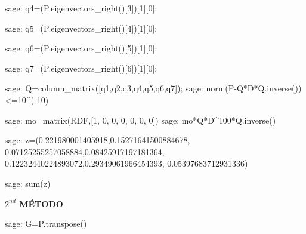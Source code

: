\begin{sagecommandline}
    sage: q4=(P.eigenvectors_right()[3])[1][0];
\end{sagecommandline}

\begin{sagecommandline}
    sage: q5=(P.eigenvectors_right()[4])[1][0];
\end{sagecommandline}

\begin{sagecommandline}
    sage: q6=(P.eigenvectors_right()[5])[1][0];
\end{sagecommandline}

\begin{sagecommandline}
    sage: q7=(P.eigenvectors_right()[6])[1][0];
\end{sagecommandline}

\begin{sagecommandline}
    sage: Q=column_matrix([q1,q2,q3,q4,q5,q6,q7]);
    sage: norm(P-Q*D*Q.inverse())<=10^(-10)
\end{sagecommandline}
    
\begin{sagecommandline}
    sage: mo=matrix(RDF,[1, 0, 0, 0, 0, 0, 0])
    sage: mo*Q*D^100*Q.inverse()
\end{sagecommandline}
    
\begin{sagecommandline}
    sage: z=(0.221980001405918,0.15271641500884678, 0.07125255257058884,0.08425917197181364, 0.12232440224893072,0.29349061966454393, 0.05397683712931336)
\end{sagecommandline}
    
\begin{sagecommandline}
    sage: sum(z)
\end{sagecommandline}
    
\par\textbf{$2^{nd}$ MÉTODO}
    
\begin{sagecommandline}
    sage: G=P.transpose()
\end{sagecommandline}
    

